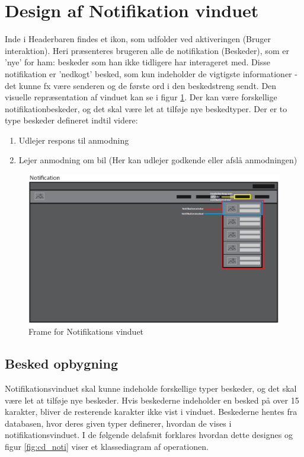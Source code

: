 \documentclass[SoftwareDesign/SoftwareDesign_main.tex]{subfiles}
\begin{document}
\section{Design af Notifikation vinduet}
Inde i Headerbaren findes et ikon, som udfolder ved aktiveringen (Bruger interaktion). Heri præsenteres brugeren alle de notifikation (Beskeder), som er 'nye' for ham: beskeder som han ikke tidligere har interageret med. Disse notifikation er 'nedkogt' besked, som kun indeholder de vigtigste informationer - det kunne fx være senderen og de første ord i den beskedstreng sendt. Den visuelle repræsentation af vinduet kan se i figur \ref{fig:wire_noti}. Der kan være forskellige notifikationbeskeder, og det skal være let at tilføje nye beskedtyper. Der er to type beskeder defineret indtil videre: 
\begin{enumerate}
    \item Udlejer respons til anmodning
    \item Lejer anmodning om bil (Her kan udlejer godkende eller afslå anmodningen) 
\end{enumerate}
\begin{figure}[H]
    \centering
    \includegraphics[width=\textwidth]{SoftwareDesign/MVVMDesigns/Graphics/noti_wirefame.png}
    \caption{Frame for Notifikations vinduet}
    \label{fig:wire_noti}
\end{figure}

\subsection{Besked opbygning}
Notifikationsvinduet skal kunne indeholde forskellige typer beskeder, og det skal være let at tilføje nye beskeder. Hvis beskederne indeholder en besked på over 15 karakter, bliver de resterende karakter ikke vist i vinduet. Beskederne hentes fra databasen, hvor deres given typer definerer, hvordan de vises i notifikationsvinduet. I de følgende delafsnit forklares hvordan dette designes og figur \ref{fig:cd_noti} viser et klassediagram af operationen.
\end{document}
